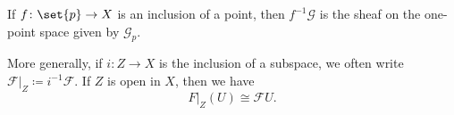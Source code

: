 If $f\colon \set{p} \to X$ is an inclusion of a point, then $f^{-1}\mathcal{G}$ is the
sheaf on the one-point space given by $\mathcal{G}_p$.

More generally, if $i\colon Z\to X$ is the inclusion of a subspace, we often write
$\mathcal{F}|_Z\coloneqq i^{-1}\mathcal{F}$. If $Z$ is open in $X$, then we have
\[ F|_Z(U) \cong \mathcal{F}U. \]
